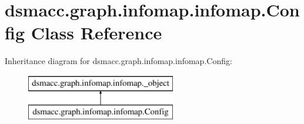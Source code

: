 \hypertarget{classdsmacc_1_1graph_1_1infomap_1_1infomap_1_1Config}{}\section{dsmacc.\+graph.\+infomap.\+infomap.\+Config Class Reference}
\label{classdsmacc_1_1graph_1_1infomap_1_1infomap_1_1Config}
Inheritance diagram for dsmacc.\+graph.\+infomap.\+infomap.\+Config\+:\begin{figure}[H]
\begin{center}
\leavevmode
\includegraphics[height=2.000000cm]{classdsmacc_1_1graph_1_1infomap_1_1infomap_1_1Config}
\end{center}
\end{figure}
